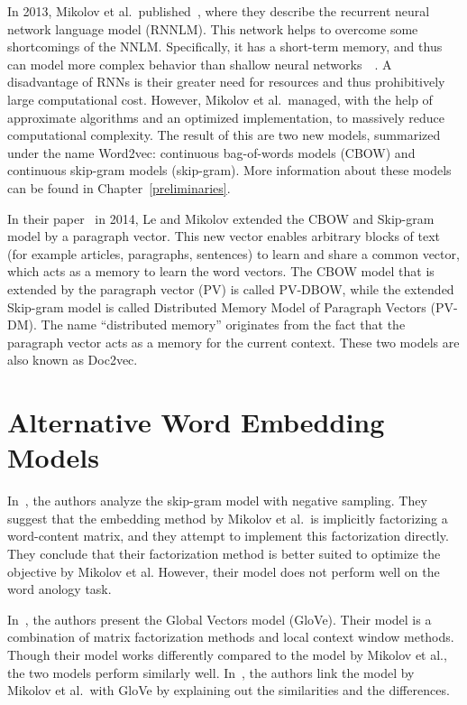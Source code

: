 In 2013, Mikolov et al.\ published~\cite{Mikolov2013a}, where they describe the recurrent neural network language model (RNNLM). This network helps to overcome some shortcomings of the NNLM\@. Specifically, it has a short-term memory, and thus can model more complex behavior than shallow neural networks~\cite{Kombrink2011}~\cite{Bengio2007}. A disadvantage of RNNs is their greater need for resources and thus prohibitively large computational cost. However, Mikolov et al.\ managed, with the help of approximate algorithms and an optimized implementation, to massively reduce computational complexity. The result of this are two new models, summarized under the name Word2vec: continuous bag-of-words models (CBOW) and continuous skip-gram models (skip-gram). More information about these models can be found in Chapter~\ref{preliminaries}.

In their paper~\cite{Le2014} in 2014, Le and Mikolov extended the CBOW and Skip-gram model by a paragraph vector. This new vector enables arbitrary blocks of text (for example articles, paragraphs, sentences) to learn and share a common vector, which acts as a memory to learn the word vectors. The CBOW model that is extended by the paragraph vector (PV) is called PV-DBOW, while the extended Skip-gram model is called Distributed Memory Model of Paragraph Vectors (PV-DM). The name ``distributed memory'' originates from the fact that the paragraph vector acts as a memory for the current context. These two models are also known as Doc2vec.

\section{Alternative Word Embedding Models}

In~\cite{Goldberg2014a}, the authors analyze the skip-gram model with negative sampling. They suggest that the embedding method by Mikolov et al.\ is implicitly factorizing a word-content matrix, and they attempt to implement this factorization directly. They conclude that their factorization method is better suited to optimize the objective by Mikolov et al. However, their model does not perform well on the word anology task.

In~\cite{Pennington2014}, the authors present the Global Vectors model (GloVe). Their model is a combination of matrix factorization methods and local context window methods. Though their model works differently compared to the model by Mikolov et al., the two models perform similarly well. In~\cite{Shi2014}, the authors link the model by Mikolov et al.\ with GloVe by explaining out the similarities and the differences.


